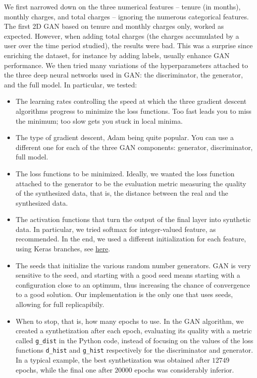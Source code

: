 \documentclass[oneside,10pt]{book}
\begin{document}
We first narrowed down on the three numerical features -- tenure (in months), monthly charges, and total charges -- ignoring the
 numerous categorical features. The first 2D GAN based on tenure and monthly charges only, worked as expected. 
However, when adding total charges (the charges accumulated by a user over the time period studied), the results were bad. This was a surprise since
 enriching the dataset, for instance by adding labels, usually enhance GAN performance. We then tried many variations of the
 hyperparameters attached to the three deep neural networks used in GAN: the discriminator, the generator, and the full model. In particular,  
 we tested: \vspace{1ex}
\begin{itemize}
\item The \textcolor{index}{learning rates} controlling the speed at which the three \textcolor{index}{gradient descent} algorithms progress to 
 minimize the \textcolor{index}{loss functions}. Too fast leads you to miss the minimum; too slow gets you stuck in local minima.
\item The type of gradient descent, \textcolor{index}{Adam} being quite popular. You can use a different one for each of the three GAN components: generator, discriminator, full model.
\item The loss functions to be minimized. Ideally, we wanted the loss function attached to the generator to be the evaluation metric measuring the
 quality of the synthesized data, that is, the distance between the real and the synthesized data. 
\item The \textcolor{index}{activation functions} that turn the output of the final layer into synthetic data. In particular, 
we tried \textcolor{index}{softmax} for integer-valued feature, as recommended. In the end, we used
 a different initialization for each feature, using Keras branches, see \href{https://github.com/VincentGranville/Notebooks/blob/main/GAN_Telecom_test2.ipynb}{here}. 
\item The \textcolor{index}{seeds} that initialize the various random number generators. GAN is very sensitive to the seed, and starting with a good seed means starting with a configuration close to an optimum, thus increasing the chance of convergence to a good solution. Our implementation is the only one that uses seeds, allowing for full replicapibily.
\item When to stop, that is, how many \textcolor{index}{epochs} to use.  In the GAN algorithm, we created a synthetization after each epoch, evaluating its quality with a metric called \texttt{g\_dist} in the Python code, instead of focusing on the values
 of the loss functions \texttt{d\_hist} and \texttt{g\_hist} respectively for the discriminator and generator. In a typical example, the best synthetization was obtained after $\num{12749}$ epochs, while the final one after $\num{20000}$ epochs was considerably inferior.
\end{itemize} \vspace{1ex}
\end{document}
